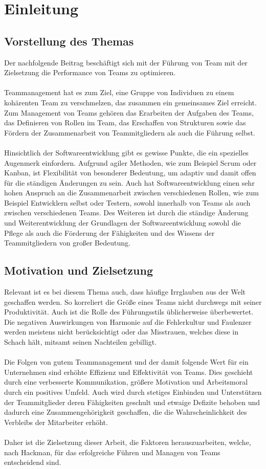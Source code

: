 \chapter{Einleitung}
\section{Vorstellung des Themas}
Der nachfolgende Beitrag beschäftigt sich mit der Führung von Team mit der Zielsetzung die Performance von Teams zu optimieren.\\\\
Teammanagement hat es zum Ziel, eine Gruppe von Individuen zu einem kohärenten Team zu verschmelzen, das zusammen ein gemeinsames Ziel erreicht. Zum Management von Teams gehören das Erarbeiten der Aufgaben des Teams, das Definieren von Rollen im Team, das Erschaffen von Strukturen sowie das Fördern der Zusammenarbeit von Teammitgliedern als auch die Führung selbst.\\\\
Hinsichtlich der Softwareentwicklung gibt es gewisse Punkte, die ein spezielles Augenmerk einfordern. Aufgrund agiler Methoden, wie zum Beispiel Scrum oder Kanban, ist Flexibilität von besonderer Bedeutung, um adaptiv und damit offen für die ständigen Änderungen zu sein. Auch hat Softwareentwicklung einen sehr hohen Anspruch an die Zusammenarbeit zwischen verschiedenen Rollen, wie zum Beispiel Entwicklern selbst oder Testern, sowohl innerhalb von Teams als auch zwischen verschiedenen Teams. Des Weiteren ist durch die ständige Änderung und Weiterentwicklung der Grundlagen der Softwareentwicklung sowohl die Pflege als auch die Förderung der Fähigkeiten und des Wissens der Teammitgliedern von großer Bedeutung.
\section{Motivation und Zielsetzung}
Relevant ist es bei diesem Thema auch, dass häufige Irrglauben aus der Welt geschaffen werden. So korreliert die Größe eines Teams nicht durchwegs mit seiner Produktivität. Auch ist die Rolle des Führungsstils üblicherweise überbewertet. Die negativen Auswirkungen von Harmonie auf die Fehlerkultur und Faulenzer werden meistens nicht berücksichtigt oder das Misstrauen, welches diese in Schach hält, mitsamt seinen Nachteilen gebilligt.\\\\
Die Folgen von gutem Teammanagement und der damit folgende Wert für ein Unternehmen sind erhöhte Effizienz und Effektivität von Teams. Dies geschieht durch eine verbesserte Kommunikation, größere Motivation und Arbeitsmoral durch ein positives Umfeld. Auch wird durch stetiges Einbinden und Unterstützen der Teammitglieder deren Fähigkeiten geschult und etwaige Defizite behoben und dadurch eine Zusammengehörigkeit geschaffen, die die Wahrscheinlichkeit des Verbleibs der Mitarbeiter erhöht.\\\\
Daher ist die Zielsetzung dieser Arbeit, die Faktoren herauszuarbeiten, welche, nach Hackman, für das erfolgreiche Führen und Managen von Teams entscheidend sind.

